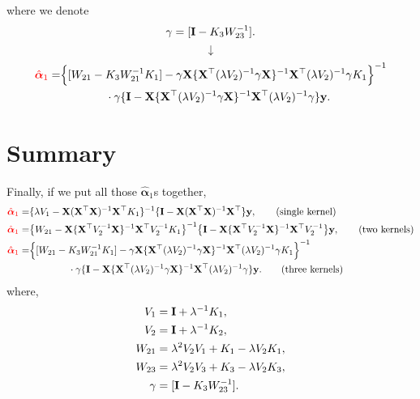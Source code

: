 \documentclass[11pt]{report}
\def\bI{{\bf I}}
\def\bX{{\bf X}}
\def\by{{\bf y}}
\def\balpha{{\boldsymbol \alpha}}
\begin{document}
where we denote \[\gamma=[\bI-K_3 W_{23}^{-1}].\]
\[\downarrow\]
\begin{align}
{\color{red}\hat{\balpha}_1}=&\Big\{[W_{21}-K_3 W_{21}^{-1}K_1]-\gamma \bX \{\bX^\top (\lambda V_2)^{-1}\gamma \bX \}^{-1}\bX^\top (\lambda V_2)^{-1} \gamma K_1\Big\}^{-1}\nonumber \\
&\qquad \qquad \cdot \gamma \{\bI-\bX \{\bX^\top (\lambda V_2)^{-1}\gamma \bX \}^{-1}\bX^\top (\lambda V_2)^{-1}\gamma\}\by.
\end{align}

\section{Summary}
Finally, if we put all those $\hat{\balpha}_1$s together, 
\begin{align*}
{\color{red}\hat{\balpha}_1}=&\{\lambda V_1-\bX (\bX^\top \bX)^{-1}\bX^\top K_1\}^{-1}\{\bI-\bX (\bX^\top \bX)^{-1}\bX^\top \}\by, \tag{single kernel}\\
{\color{red}\hat{\balpha}_1}=&\big\{W_{21}-\bX \{\bX^\top V_2^{-1} \bX \}^{-1}\bX^\top V_2^{-1} K_1\big\}^{-1} \big\{\bI-\bX \{\bX^\top V_2^{-1} \bX \}^{-1}\bX^\top V_2^{-1}\big\}\by, \tag{two kernels}\\
{\color{red}\hat{\balpha}_1}=&\Big\{[W_{21}-K_3 W_{21}^{-1}K_1]-\gamma \bX \{\bX^\top (\lambda V_2)^{-1}\gamma \bX \}^{-1}\bX^\top (\lambda V_2)^{-1} \gamma K_1\Big\}^{-1}\nonumber \\
&\qquad \qquad \cdot \gamma \{\bI-\bX \{\bX^\top (\lambda V_2)^{-1}\gamma \bX \}^{-1}\bX^\top (\lambda V_2)^{-1}\gamma\}\by. \tag{three kernels}
\end{align*}
where,
\begin{align*}
V_1&=\bI+\lambda^{-1}K_1, \\
V_2&=\bI+\lambda^{-1}K_2, \\
W_{21}&=\lambda^2 V_2 V_1+K_1-\lambda V_2 K_1,\\
W_{23}&=\lambda^2 V_2 V_3+K_3-\lambda V_2 K_3,\\
\gamma&=[\bI-K_3 W_{23}^{-1}].
\end{align*}



\newpage
\end{document}
